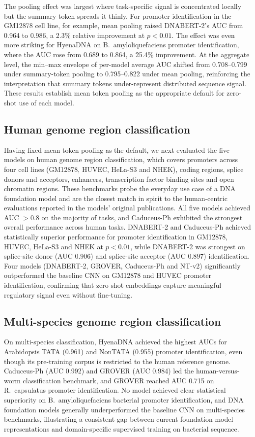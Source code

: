\documentclass[11pt,a4paper]{article}
\begin{document}
The pooling effect was largest where task-specific signal is concentrated locally but the summary token spreads it thinly. For promoter identification in the GM12878 cell line, for example, mean pooling raised DNABERT-2's AUC from 0.964 to 0.986, a 2.3\% relative improvement at $p < 0.01$. The effect was even more striking for HyenaDNA on B.~amyloliquefaciens promoter identification, where the AUC rose from 0.689 to 0.864, a 25.4\% improvement. At the aggregate level, the min--max envelope of per-model average AUC shifted from 0.708--0.799 under summary-token pooling to 0.795--0.822 under mean pooling, reinforcing the interpretation that summary tokens under-represent distributed sequence signal. These results establish mean token pooling as the appropriate default for zero-shot use of each model.

\subsection{Human genome region classification}
Having fixed mean token pooling as the default, we next evaluated the five models on human genome region classification, which covers promoters across four cell lines (GM12878, HUVEC, HeLa-S3 and NHEK), coding regions, splice donors and acceptors, enhancers, transcription factor binding sites and open chromatin regions. These benchmarks probe the everyday use case of a DNA foundation model and are the closest match in spirit to the human-centric evaluations reported in the models' original publications. All five models achieved AUC $> 0.8$ on the majority of tasks, and Caduceus-Ph exhibited the strongest overall performance across human tasks. DNABERT-2 and Caduceus-Ph achieved statistically superior performance for promoter identification in GM12878, HUVEC, HeLa-S3 and NHEK at $p < 0.01$, while DNABERT-2 was strongest on splice-site donor (AUC 0.906) and splice-site acceptor (AUC 0.897) identification. Four models (DNABERT-2, GROVER, Caduceus-Ph and NT-v2) significantly outperformed the baseline CNN on GM12878 and HUVEC promoter identification, confirming that zero-shot embeddings capture meaningful regulatory signal even without fine-tuning.

\subsection{Multi-species genome region classification}
On multi-species classification, HyenaDNA achieved the highest AUCs for Arabidopsis TATA (0.961) and NonTATA (0.955) promoter identification, even though its pre-training corpus is restricted to the human reference genome. Caduceus-Ph (AUC 0.992) and GROVER (AUC 0.984) led the human-versus-worm classification benchmark, and GROVER reached AUC 0.715 on R.~capsulatus promoter identification. No model achieved clear statistical superiority on B.~amyloliquefaciens bacterial promoter identification, and DNA foundation models generally underperformed the baseline CNN on multi-species benchmarks, illustrating a consistent gap between current foundation-model representations and domain-specific supervised training on bacterial sequence.
\end{document}
